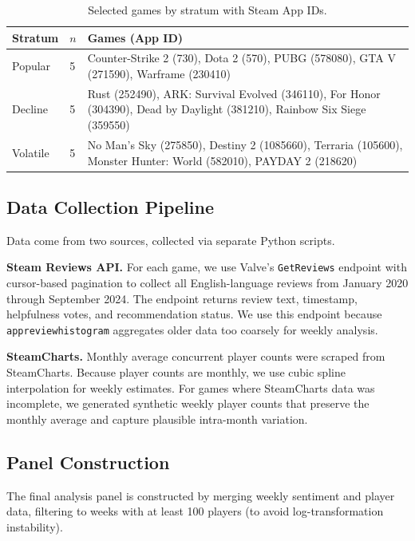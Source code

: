\documentclass[11pt, letterpaper]{article}
\begin{document}
\begin{table}[H]
\centering
\small
\caption{Selected games by stratum with Steam App IDs.}
\label{tab:games}
\begin{tabular}{llp{7.5cm}}
\toprule
\textbf{Stratum} & $n$ & \textbf{Games (App ID)} \\
\midrule
Popular   & 5 & Counter-Strike 2 (730), Dota 2 (570), PUBG (578080), GTA V (271590), Warframe (230410) \\[0.3em]
Decline   & 5 & Rust (252490), ARK: Survival Evolved (346110), For Honor (304390), Dead by Daylight (381210), Rainbow Six Siege (359550) \\[0.3em]
Volatile  & 5 & No Man's Sky (275850), Destiny 2 (1085660), Terraria (105600), Monster Hunter: World (582010), PAYDAY 2 (218620) \\
\bottomrule
\end{tabular}
\end{table}

\subsection{Data Collection Pipeline}

Data come from two sources, collected via separate Python scripts.

\medskip\noindent\textbf{Steam Reviews API.}
For each game, we use Valve's \texttt{GetReviews} endpoint with cursor-based pagination to collect all English-language reviews from January 2020 through September 2024.
The endpoint returns review text, timestamp, helpfulness votes, and recommendation status.
We use this endpoint because \texttt{appreviewhistogram} aggregates older data too coarsely for weekly analysis.

\medskip\noindent\textbf{SteamCharts.}
Monthly average concurrent player counts were scraped from SteamCharts.
Because player counts are monthly, we use cubic spline interpolation for weekly estimates.
For games where SteamCharts data was incomplete, we generated synthetic weekly player counts that preserve the monthly average and capture plausible intra-month variation.

\subsection{Panel Construction}

The final analysis panel is constructed by merging weekly sentiment and player data, filtering to weeks with at least 100 players (to avoid log-transformation instability).
\end{document}
